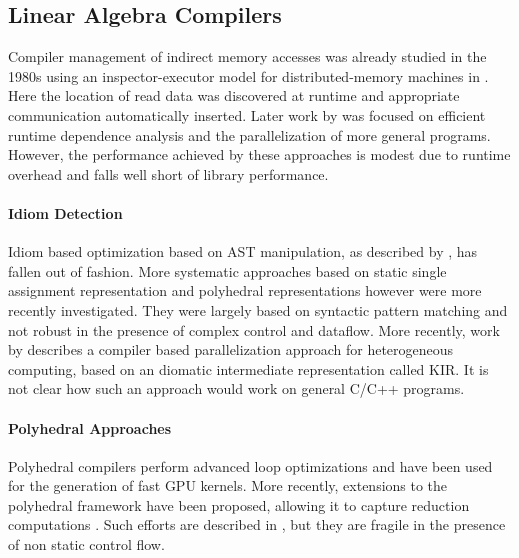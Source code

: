 \subsection{Linear Algebra Compilers}

    Compiler management of indirect memory accesses was already studied in the
    1980s using an inspector-executor model for distributed-memory machines in
    \citet{Baxter:1989:RPS:72935.72967}.
    Here the location of read data was discovered at runtime and appropriate
    communication automatically inserted.
    Later work by \citet{pottenger1995idiom,fisher1994parallelizing,
    rauchwerger1999lrpd,suganuma1996detection} was focused on efficient runtime
    dependence analysis and the parallelization of more general programs.
    However, the performance achieved by these approaches is modest due to
    runtime overhead and falls well short of library performance.

\paragraph*{Idiom Detection}
    Idiom based optimization based on AST manipulation, as described by
    \citet{Pinter:1994:POP:177492.177494}, has fallen out of fashion.
    More systematic approaches based on static single assignment representation
    \cite{lattner2004llvm} and polyhedral representations
    \cite{benabderrahmane2010polyhedral} however were more recently
    investigated.
    They were largely based on syntactic pattern matching and not robust in the
    presence of complex control and dataflow.
    More recently, work by \citet{Andion2015Compilation} describes a compiler
    based parallelization approach for heterogeneous computing, based on an
    diomatic intermediate representation called KIR.  
    It is not clear how such an approach would work on general C/C++ programs.

\paragraph*{Polyhedral Approaches}
    Polyhedral compilers \cite{Baskaran:2010:ACC:2175462.2175482,Verdoolaege:2013:PPC:2400682.2400713} perform advanced loop optimizations and have been used for the generation of fast GPU kernels.
    More recently, extensions to the polyhedral framework have been proposed, allowing it to capture reduction computations \cite{chi1997optimizing, gupta2006simplifying, stock2014framework}.
    Such efforts are described in \cite{Doerfert2015Polly}, but they are fragile in the presence of non static control flow.

